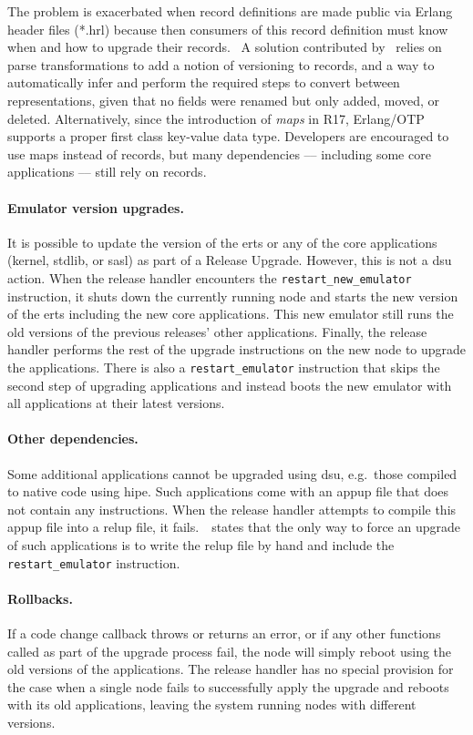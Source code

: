 The problem is exacerbated when record definitions are made public via Erlang header files (*.hrl) because then consumers of this record definition must know when and how to upgrade their records.~\cite{davis:talk} A solution contributed by~\cite{wiger:parsetrans} relies on parse transformations to add a notion of versioning to records, and a way to automatically infer and perform the required steps to convert between representations, given that no fields were renamed but only added, moved, or deleted. Alternatively, since the introduction of \emph{maps} in R17, Erlang/OTP supports a proper first class key-value data type. Developers are encouraged to use maps instead of records, but many dependencies –– including some core applications –– still rely on records.

\paragraph{Emulator version upgrades.} It is possible to update the version of the \acrfull{erts} or any of the core applications (kernel, stdlib, or sasl) as part of a Release Upgrade. However, this is not a \acrshort{dsu} action. When the release handler encounters the \lstinline|restart_new_emulator| instruction, it shuts down the currently running node and starts the new version of the \acrshort{erts} including the new core applications. This new emulator still runs the old versions of the previous releases' other applications. Finally, the release handler performs the rest of the upgrade instructions on the new node to upgrade the applications. There is also a \lstinline|restart_emulator| instruction that skips the second step of upgrading applications and instead boots the new emulator with all applications at their latest versions.

\paragraph{Other dependencies.}
Some additional applications cannot be upgraded using \acrshort{dsu}, e.g.~those compiled to native code using \acrshort{hipe}. Such applications come with an appup file that does not contain any instructions. When the release handler attempts to compile this appup file into a relup file, it fails.~\cite{doc:otp}~states that the only way to force an upgrade of such applications is to write the \acrshort{relup} file by hand and include the \lstinline|restart_emulator| instruction.


\paragraph{Rollbacks.} If a code change callback throws or returns an error, or if any other functions called as part of the upgrade process fail, the node will simply reboot using the old versions of the applications. The release handler has no special provision for the case when a single node fails to successfully apply the upgrade and reboots with its old applications, leaving the system running nodes with different versions.


